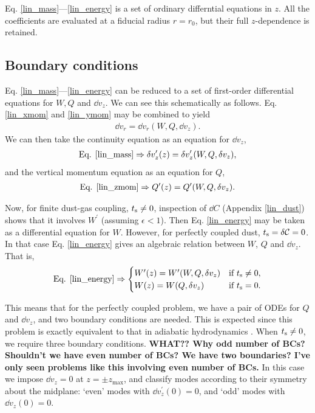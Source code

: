 Eq. \ref{lin_mass}---\ref{lin_energy} is a set of ordinary
differntial equations in $z$. All the coefficients are evaluated at a
fiducial radius $r=r_0$, but their full $z$-dependence is retained.  
\subsection{Boundary conditions}
Eq. \ref{lin_mass}---\ref{lin_energy} can be reduced to a set of
first-order differential equations for $W, Q$ and $\dd v_z$. We can
see this schematically as follows. Eq. \ref{lin_xmom} and
\ref{lin_ymom} may be combined to yield 
\begin{align*}
  \dd v_r = \dd v_r (W, Q, \dd v_z). 
\end{align*} 
We can then take the continuity equation as an equation for $\dd v_z$, 
\begin{align*}
\text{Eq. \ref{lin_mass}} \Rightarrow \delta v_z^\prime(z) = \delta
  v_z^\prime(W,Q,\delta v_z),
\end{align*}
and the vertical momentum equation as an equation for $Q$, 
\begin{align*}
\text{Eq. \ref{lin_zmom}} \Rightarrow Q^\prime(z) = 
 Q^\prime(W,Q,\delta v_z). 
\end{align*}

Now, for finite dust-gas coupling, $t_\mathrm{s}\neq0$, inspection of $\dd C$
(Appendix \ref{lin_dust}) shows that it involves $W^\prime$ (assuming
$\epsilon < 1$). Then Eq. \ref{lin_energy} may be taken as a
differential equation for $W$. However, for perfectly coupled dust,
$t_\mathrm{s} =\delta\mathcal{C}= 0$. In that case Eq. \ref{lin_energy} gives an algebraic
relation between $W$, $Q$ and $\dd v_z$. That is,
\begin{align*}
\text{Eq. \ref{lin_energy}}\Rightarrow \begin{cases}
  W^\prime(z) = W^\prime(W, Q, \delta v_z) & \text{if } t_\mathrm{s} \neq 0, \\
  W           (z) = W(Q, \delta v_z) & \text{if }t_\mathrm{s} = 0.
\end{cases}
\end{align*} 

This means that for the perfectly coupled problem, we have a pair of
ODEs for $Q$ and $\dd v_z$, and two boundary conditions are needed. 
This is expected since this problem is exactly 
equivalent to that in adiabatic hydrodynamics \citep[e.g.]{lubow93}. When
$t_\mathrm{s}\neq0$, we require three boundary conditions. {\bf WHAT?? Why odd
  number of BCs? Shouldn't we have even number of BCs? We have
two boundaries? I've only seen problems like this involving even
number of BCs.} In this case we impose $\dd v_z =0$ at $z=\pm
z_\mathrm{max}$, and classify modes according to their symmetry about
the midplane: `even' modes with $\dd v_z^\prime(0) = 0$, and `odd' 
modes with $\dd v_z(0)=0$.       

